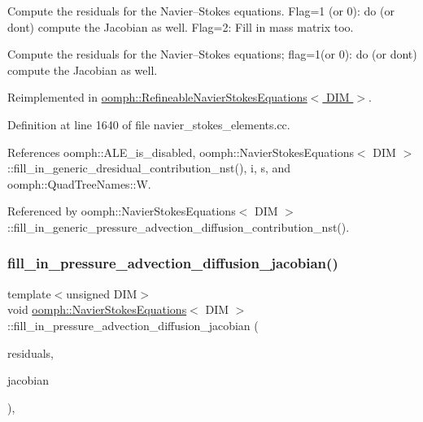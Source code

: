 Compute the residuals for the Navier--Stokes equations. Flag=1 (or 0)\+: do (or don\textquotesingle{}t) compute the Jacobian as well. Flag=2\+: Fill in mass matrix too. 

Compute the residuals for the Navier--Stokes equations; flag=1(or 0)\+: do (or don\textquotesingle{}t) compute the Jacobian as well. 

Reimplemented in \hyperlink{classoomph_1_1RefineableNavierStokesEquations_a63a9aff288190f8d2abb0e985c08c1f0}{oomph\+::\+Refineable\+Navier\+Stokes\+Equations$<$ D\+I\+M $>$}.



Definition at line 1640 of file navier\+\_\+stokes\+\_\+elements.\+cc.



References oomph\+::\+A\+L\+E\+\_\+is\+\_\+disabled, oomph\+::\+Navier\+Stokes\+Equations$<$ D\+I\+M $>$\+::fill\+\_\+in\+\_\+generic\+\_\+dresidual\+\_\+contribution\+\_\+nst(), i, s, and oomph\+::\+Quad\+Tree\+Names\+::W.



Referenced by oomph\+::\+Navier\+Stokes\+Equations$<$ D\+I\+M $>$\+::fill\+\_\+in\+\_\+generic\+\_\+pressure\+\_\+advection\+\_\+diffusion\+\_\+contribution\+\_\+nst().

\mbox{\label{classoomph_1_1NavierStokesEquations_a43e4ca1dd5a520ca5df800c97cd92f8e}} 
\subsubsection{\texorpdfstring{fill\+\_\+in\+\_\+pressure\+\_\+advection\+\_\+diffusion\+\_\+jacobian()}{fill\_in\_pressure\_advection\_diffusion\_jacobian()}}
{\footnotesize\ttfamily template$<$unsigned D\+IM$>$ \\
void \hyperlink{classoomph_1_1NavierStokesEquations}{oomph\+::\+Navier\+Stokes\+Equations}$<$ D\+IM $>$\+::fill\+\_\+in\+\_\+pressure\+\_\+advection\+\_\+diffusion\+\_\+jacobian (\begin{DoxyParamCaption}\item[{\hyperlink{classoomph_1_1Vector}{Vector}$<$ double $>$ \&}]{residuals,  }\item[{\hyperlink{classoomph_1_1DenseMatrix}{Dense\+Matrix}$<$ double $>$ \&}]{jacobian }\end{DoxyParamCaption})\hspace{0.3cm}{\ttfamily [inline]}, {\ttfamily [virtual]}}



